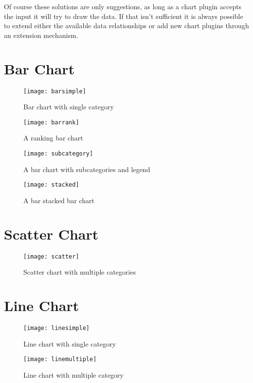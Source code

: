 Of course these solutions are only suggestions, as long as a chart plugin accepts the input it will try to draw the data. If that isn't sufficient it is always possible to extend either the available data relationships or add new chart plugins through an extension mechanism.

\section{Bar Chart}
\begin{figure}[H]
	\centering
	\texttt{[image: barsimple]}
	\caption{Bar chart with single category}
\end{figure}

\begin{figure}[H]
	\centering
	\texttt{[image: barrank]}
	\caption{A ranking bar chart}
\end{figure}

\begin{figure}[H]
	\centering
	\texttt{[image: subcategory]}
	\caption{A bar chart with subcategories and legend}
\end{figure}

\begin{figure}[H]
	\centering
	\texttt{[image: stacked]}
	\caption{A bar stacked bar chart}
\end{figure}

\section{Scatter Chart}
\begin{figure}[H]
	\centering
	\texttt{[image: scatter]}
	\caption{Scatter chart with multiple categories}
\end{figure}

\section{Line Chart}
\begin{figure}[H]
\centering
\texttt{[image: linesimple]}
\caption{Line chart with single category}
\end{figure}

\begin{figure}[H]
\centering
\texttt{[image: linemultiple]}
\caption{Line chart with multiple category}
\end{figure}


